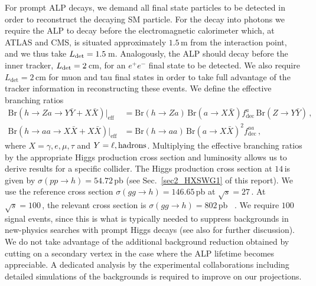 For prompt ALP decays, we demand all final state particles to be detected in order to reconstruct the decaying SM particle. For the decay into photons we 
require the ALP to decay before the electromagnetic calorimeter which, at ATLAS and CMS, is situated approximately $1.5\,$m from the interaction point, and we thus take $L_{\rm det} = 
1.5\,$m. Analogously, the ALP should decay before the inner tracker, $L_{\rm det} = 2\,$cm, for an $e^+e^-$ final state to be detected. We also require $L_\text{det}
=2\,$cm for muon and tau final states in order to take full advantage of the tracker information in reconstructing these events. We define the effective branching ratios
%
\begin{align}
\text{Br}(h\to Za\to Y\bar{Y}+X\bar{X})\big\vert_\text{eff}&=\text{Br}(h\to Za)\,\text{Br}(a\to X\bar{X})f_\text{dec}^a\,\text{Br}(Z\to Y\bar{Y})\,,\label{eq:LHChZa}\\
\text{Br}(h\to aa\to X\bar{X}+X\bar{X})\big\vert_\text{eff}&=\text{Br}(h\to aa)\,\text{Br}(a\to X\bar{X})^2f_\text{dec}^{aa}\,,\label{eq:LHChaa}
\end{align}
%
where $X=\gamma, e, \mu, \tau$ and $Y=\ell, {\rm hadrons}$. Multiplying the effective branching ratios by the appropriate Higgs production cross section and luminosity allows us to derive results for a specific collider. The Higgs production cross section at $14\,$\UTeV is given by $\sigma(pp\to h)= 54.72\,$pb (see Sec.~\ref{sec2_HXSWG1} of this report). We use the reference cross section $\sigma(gg 
\to h) = 146.65\,$pb at $\sqrt{s} = 27\,$\UTeV. At $\sqrt{s} = 100\,$\UTeV, the relevant cross section is $\sigma(gg \to h) = 802\,$pb ~\cite{Mangano:2016jyj}. We require $100$ signal events, since this is what is typically needed to suppress backgrounds in new-physics searches with prompt Higgs decays \cite{Khachatryan:2016vau, Chatrchyan:2013vaa,Aad:2015bua} (see also \cite{Bauer:2017ris} for 
further discussion).
We do not take advantage of the additional background reduction obtained by cutting on a secondary vertex in the case where the ALP lifetime becomes appreciable. A dedicated analysis by the experimental collaborations including detailed simulations of the backgrounds is required to improve on our projections.  


